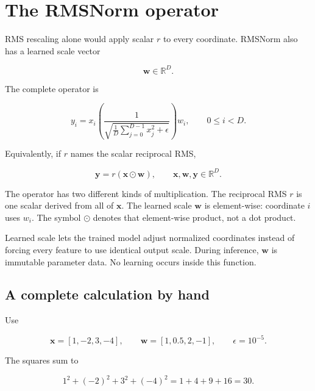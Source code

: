 \section{The RMSNorm operator}\label{the-rmsnorm-operator}

RMS rescaling alone would apply scalar \(r\) to every coordinate.
RMSNorm also has a learned scale vector

\begin{equation}
\mathbf{w}\in\mathbb{R}^{D}.
\end{equation}

The complete operator is

\begin{equation}
\boxed{
y_i=x_i
\left(
\frac{1}{\sqrt{\frac{1}{D}\sum_{j=0}^{D-1}x_j^2+\epsilon}}
\right)
w_i
},
\qquad 0\le i<D.
\end{equation}

Equivalently, if \(r\) names the scalar reciprocal RMS,

\begin{equation}
\mathbf{y}=r(\mathbf{x}\odot\mathbf{w}),
\qquad
\mathbf{x},\mathbf{w},\mathbf{y}\in\mathbb{R}^{D}.
\end{equation}

The operator has two different kinds of multiplication. The reciprocal
RMS \(r\) is one scalar derived from all of \(\mathbf{x}\). The learned
scale \(\mathbf{w}\) is element-wise: coordinate \(i\) uses \(w_i\). The
symbol \(\odot\) denotes that element-wise product, not a dot product.

Learned scale lets the trained model adjust normalized coordinates
instead of forcing every feature to use identical output scale. During
inference, \(\mathbf{w}\) is immutable parameter data. No learning
occurs inside this function.


\subsection{A complete calculation by
hand}\label{a-complete-calculation-by-hand}

Use

\begin{equation}
\mathbf{x}=[1,-2,3,-4],\qquad
\mathbf{w}=[1,0.5,2,-1],\qquad
\epsilon=10^{-5}.
\end{equation}

The squares sum to

\begin{equation}
1^2+(-2)^2+3^2+(-4)^2=1+4+9+16=30.
\end{equation}


